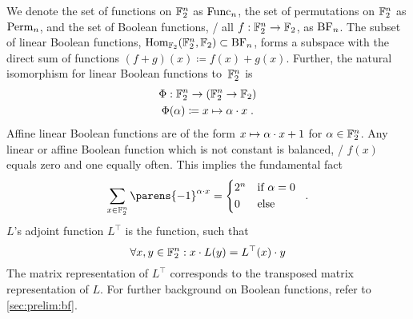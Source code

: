 We denote the set of functions on $\mathbb{F}_2^n$ as $\func/_n$, the set of permutations on $\mathbb{F}_2^n$ as $\perm/_n$, and the set of Boolean functions, \ie/ all $f : \mathbb{F}_2^n \to \mathbb{F}_2$, as $\boolfunc/_n$.
The subset of linear Boolean functions, $\mathrm{Hom}_{\F_2}(\F_2^n, \F_2) \subset \boolfunc/_n$, forms a subspace with the direct sum of functions $(f + g)(x) \coloneqq f(x) + g(x)$.
Further, the natural isomorphism for linear Boolean functions to~$\mathbb{F}_2^n$ is
\begin{gather*}
    \Phi : \mathbb{F}_2^n \to (\mathbb{F}_2^n \to \mathbb{F}_2) \\
    \Phi(\alpha) \coloneqq x \mapsto \alpha \cdot x\;.
\end{gather*}
Affine linear Boolean functions are of the form $x \mapsto \alpha \cdot x + 1$ for $\alpha \in \mathbb{F}_2^n$.
Any linear or affine Boolean function which is not constant is balanced, \ie/ $f(x)$ equals zero and one equally often.
This implies the fundamental fact
\begin{equation}\label{eqn:sum-fact}
    \sum_{x \in \F_2^n} \parens{-1}^{\iprod{\alpha}{x}} = \begin{cases*}
        2^n & if $\alpha = 0$ \\
        0   & else
    \end{cases*}\;.
\end{equation}
$L$'s adjoint function $L^\top$ is the function, such that
\begin{equation}\label{eqn:adjoint}
    \forall x,y \in \mathbb{F}_2^n : x \cdot L(y) = L^\top(x) \cdot y
\end{equation}
The matrix representation of $L^\top$ corresponds to the transposed matrix representation of $L$.
For further background on Boolean functions, refer to \cref{sec:prelim:bf}.

